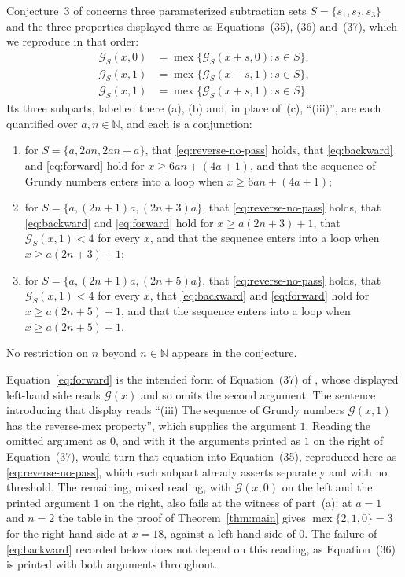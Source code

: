 \documentclass[11pt]{amsart}
\theoremstyle{remark}
\newcommand{\mex}{\operatorname{mex}}
\newcommand{\G}{\mathcal{G}}
\begin{document}
Conjecture~3 of \cite{LMM} concerns three parameterized subtraction
sets $S=\{s_1,s_2,s_3\}$ and the three properties displayed there as
Equations~(35), (36) and~(37), which we reproduce in that order:
\begin{align}
\G_S(x,0)
 &=\mex\{\G_S(x+s,0):s\in S\},
 \label{eq:reverse-no-pass}\\
\G_S(x,1)
 &=\mex\{\G_S(x-s,1):s\in S\},
 \label{eq:backward}\\
\G_S(x,1)
 &=\mex\{\G_S(x+s,1):s\in S\}.
 \label{eq:forward}
\end{align}
Its three subparts, labelled there (a), (b) and, in place of~(c),
``(iii)'', are each quantified over $a,n\in\mathbb N$, and each is a
conjunction:
\begin{enumerate}
\item[(a)] for $S=\{a,2an,2an+a\}$, that \eqref{eq:reverse-no-pass}
holds, that \eqref{eq:backward} and \eqref{eq:forward} hold for
$x\geq6an+(4a+1)$, and that the sequence of Grundy numbers enters into
a loop when $x\geq6an+(4a+1)$;

\item[(b)] for $S=\{a,(2n+1)a,(2n+3)a\}$, that
\eqref{eq:reverse-no-pass} holds, that \eqref{eq:backward} and
\eqref{eq:forward} hold for $x\geq a(2n+3)+1$, that $\G_S(x,1)<4$ for
every $x$, and that the sequence enters into a loop when
$x\geq a(2n+3)+1$;

\item[(iii)] for $S=\{a,(2n+1)a,(2n+5)a\}$, that
\eqref{eq:reverse-no-pass} holds, that $\G_S(x,1)<4$ for every $x$,
that \eqref{eq:backward} and \eqref{eq:forward} hold for
$x\geq a(2n+5)+1$, and that the sequence enters into a loop when
$x\geq a(2n+5)+1$.
\end{enumerate}
No restriction on $n$ beyond $n\in\mathbb N$ appears in the
conjecture.

Equation~\eqref{eq:forward} is the intended form of Equation~(37) of
\cite{LMM}, whose displayed left-hand side reads $\G(x)$ and so omits
the second argument. The sentence introducing that display reads
``(iii) The sequence of Grundy numbers $\G(x,1)$ has the reverse-mex
property'', which supplies the argument $1$. Reading the omitted
argument as $0$, and with it the arguments printed as $1$ on the right
of Equation~(37), would turn that equation into Equation~(35),
reproduced here as \eqref{eq:reverse-no-pass}, which each subpart
already asserts separately and with no threshold. The remaining, mixed
reading, with $\G(x,0)$ on the left and the printed argument $1$ on the
right, also fails at the witness of part~(a): at $a=1$ and $n=2$ the
table in the proof of Theorem~\ref{thm:main} gives $\mex\{2,1,0\}=3$
for the right-hand side at $x=18$, against a left-hand side of $0$.
The failure of
\eqref{eq:backward} recorded below does not depend on this reading, as
Equation~(36) is printed with both arguments throughout.
\end{document}

